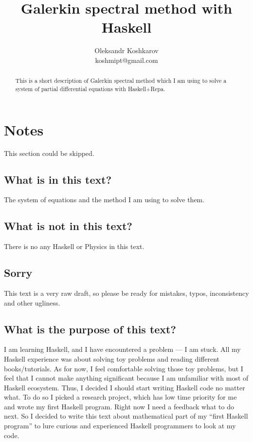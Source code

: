 \documentclass[preprint,aip,pop]{article}
\date{}
\begin{document}
\title{Galerkin spectral method with Haskell}
\author{Oleksandr Koshkarov\\\small{koshmipt@gmail.com}}

\maketitle

\begin{abstract}
    This is a short description of Galerkin spectral method which I am using to
    solve a system of partial differential equations with Haskell+Repa.
\end{abstract}

\section{Notes}
This section could be skipped.
\subsection{What is in this text?}
The system of equations and the method I am using to solve them.
\subsection{What is not in this text?}
There is no any Haskell or Physics in this text.
\subsection{Sorry}
This text is a very raw draft, so please be ready for mistakes, typos,
inconsistency and other ugliness.
\subsection{What is the purpose of this text?}
I am learning Haskell, and I have encountered a problem --- I am stuck.
All my Haskell experience was about solving toy problems and reading different
books/tutorials. As for now, I feel comfortable solving those toy problems, but
I feel that I cannot make anything significant because I am unfamiliar with
most of Haskell ecosystem. Thus, I decided I should start writing Haskell code no
matter what. 
To do so I picked a research project, which has low time priority for me and
wrote my first Haskell program.
Right now I need a feedback what to do next.
So I decided to write this text about mathematical part of my ``first Haskell
program'' to lure curious and experienced Haskell programmers to look at my code.
\end{document}
